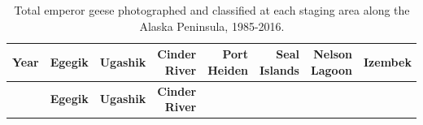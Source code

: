 \documentclass[]{article}
\begin{document}
\setlength{\parindent}{0in} \setlength{\leftskip}{0in}
\setlength{\parskip}{0pt} \noindent
\newpage

\begin{longtable}[]{@{}rrrrrrrr@{}}
\caption{Total emperor geese photographed and classified at each staging
area along the Alaska Peninsula, 1985-2016.}\tabularnewline
\toprule
\begin{minipage}[b]{0.08\columnwidth}\raggedleft\strut
\textbf{Year}\strut
\end{minipage} & \begin{minipage}[b]{0.10\columnwidth}\raggedleft\strut
\textbf{Egegik}\strut
\end{minipage} & \begin{minipage}[b]{0.11\columnwidth}\raggedleft\strut
\textbf{Ugashik}\strut
\end{minipage} & \begin{minipage}[b]{0.08\columnwidth}\raggedleft\strut
\textbf{Cinder River}\strut
\end{minipage} & \begin{minipage}[b]{0.14\columnwidth}\raggedleft\strut
\textbf{Port Heiden}\strut
\end{minipage} & \begin{minipage}[b]{0.09\columnwidth}\raggedleft\strut
\textbf{Seal Islands}\strut
\end{minipage} & \begin{minipage}[b]{0.08\columnwidth}\raggedleft\strut
\textbf{Nelson Lagoon}\strut
\end{minipage} & \begin{minipage}[b]{0.10\columnwidth}\raggedleft\strut
\textbf{Izembek}\strut
\end{minipage}\tabularnewline
\midrule
\endfirsthead
\toprule
\begin{minipage}[b]{0.08\columnwidth}\raggedleft\strut
~\strut
\end{minipage} & \begin{minipage}[b]{0.10\columnwidth}\raggedleft\strut
\textbf{Egegik}\strut
\end{minipage} & \begin{minipage}[b]{0.11\columnwidth}\raggedleft\strut
\textbf{Ugashik}\strut
\end{minipage} & \begin{minipage}[b]{0.08\columnwidth}\raggedleft\strut
\textbf{Cinder River}\strut
\end{minipage} & \begin{minipage}[b]{0.14\columnwidth}\raggedleft\strut

\end{minipage}
\end{longtable}
\end{document}
